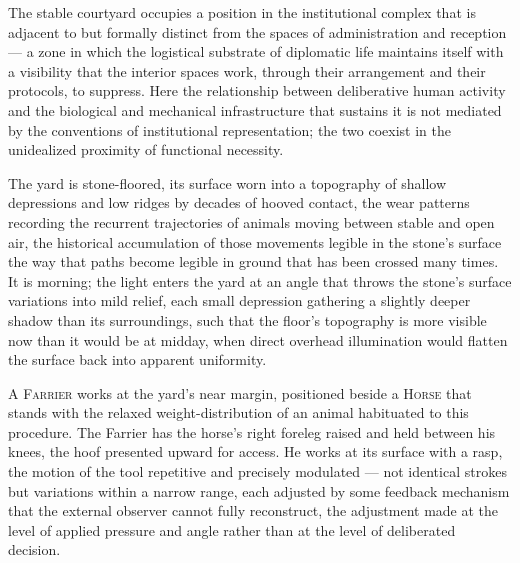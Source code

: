 \documentclass[12pt, oneside]{article}
\newenvironment{action}{%
  \vspace{0.6em}%
  \noindent\ignorespaces%
}{%
  \par\vspace{0.6em}%
}
\begin{document}
\begin{action}
The stable courtyard occupies a position in the institutional complex that is adjacent to but formally distinct from the spaces of administration and reception --- a zone in which the logistical substrate of diplomatic life maintains itself with a visibility that the interior spaces work, through their arrangement and their protocols, to suppress. Here the relationship between deliberative human activity and the biological and mechanical infrastructure that sustains it is not mediated by the conventions of institutional representation; the two coexist in the unidealized proximity of functional necessity.

The yard is stone-floored, its surface worn into a topography of shallow depressions and low ridges by decades of hooved contact, the wear patterns recording the recurrent trajectories of animals moving between stable and open air, the historical accumulation of those movements legible in the stone's surface the way that paths become legible in ground that has been crossed many times. It is morning; the light enters the yard at an angle that throws the stone's surface variations into mild relief, each small depression gathering a slightly deeper shadow than its surroundings, such that the floor's topography is more visible now than it would be at midday, when direct overhead illumination would flatten the surface back into apparent uniformity.

A \textsc{Farrier} works at the yard's near margin, positioned beside a \textsc{Horse} that stands with the relaxed weight-distribution of an animal habituated to this procedure. The Farrier has the horse's right foreleg raised and held between his knees, the hoof presented upward for access. He works at its surface with a rasp, the motion of the tool repetitive and precisely modulated --- not identical strokes but variations within a narrow range, each adjusted by some feedback mechanism that the external observer cannot fully reconstruct, the adjustment made at the level of applied pressure and angle rather than at the level of deliberated decision.
\end{action}
\end{document}
